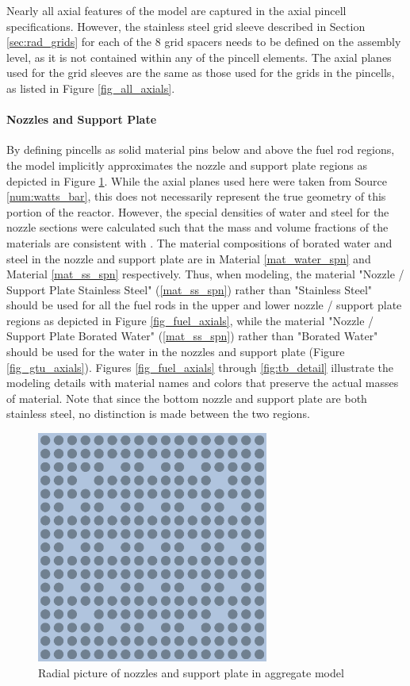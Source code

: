 Nearly all axial features of the model are captured in the axial pincell
specifications. However, the stainless steel grid sleeve described in Section
\ref{sec:rad_grids} for each of the 8 grid spacers needs to be defined on the
assembly level, as it is not contained within any of the pincell elements.  The
axial planes used for the grid sleeves are the same as those used for the grids
in the pincells, as listed in Figure \ref{fig_all_axials}.

\paragraph{Nozzles and Support Plate}\label{par:nozzle}

By defining pincells as solid material pins below and
above the fuel rod regions, the model implicitly approximates the nozzle and
support plate regions as depicted in Figure \ref{fig_nozzles}.  While the axial
planes used here were taken from Source \ref{num:watts_bar}, this does not
necessarily represent the true geometry of this portion of the reactor.  However,
the special densities of water and steel for the nozzle sections were
calculated such that the mass and volume fractions of the materials are
consistent with \cite{ml033530020}. The material compositions of borated water 
and steel in the nozzle and support plate are in Material \ref{mat_water_spn}
and Material \ref{mat_ss_spn} respectively.
Thus, when modeling, the material "Nozzle / Support Plate Stainless Steel"
(\ref{mat_ss_spn}) rather than "Stainless Steel" should be used for all the fuel
rods in the upper and lower nozzle / support plate regions as depicted in Figure
\ref{fig_fuel_axials}, while the material "Nozzle / Support Plate Borated Water"
(\ref{mat_ss_spn}) rather than "Borated Water" should be used for the water in
the nozzles and support plate (Figure \ref{fig_gtu_axials}). Figures
\ref{fig_fuel_axials} through \ref{fig:tb_detail} illustrate the modeling details
with material names and colors that preserve the actual masses of material. 
Note that since the bottom nozzle and
support plate are both stainless steel, no distinction is made between the two
regions.

\begin{figure}[htpb]
  \centering
  \includegraphics[width=3in]{specifications/axial/figs/J8_nozzle.png}
  \caption{Radial picture of nozzles and support plate in aggregate model \label{fig_nozzles}}
\end{figure}

